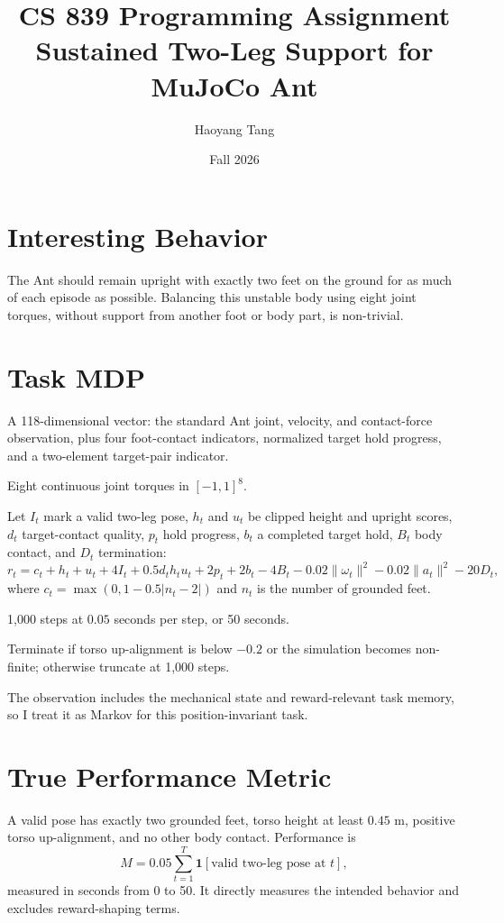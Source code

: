 \documentclass[11pt]{article}
\title{CS 839 Programming Assignment\\Sustained Two-Leg Support for MuJoCo Ant}
\author{Haoyang Tang}
\date{Fall 2026}
\begin{document}
\maketitle

\section{Interesting Behavior}
The Ant should remain upright with exactly two feet on the ground for as much
of each episode as possible. Balancing this unstable body using eight joint
torques, without support from another foot or body part, is non-trivial.

\section{Task MDP}
\begin{description}[style=nextline]
\item[State.] A 118-dimensional vector: the standard Ant joint, velocity, and
contact-force observation, plus four foot-contact indicators, normalized target
hold progress, and a two-element target-pair indicator.
\item[Action.] Eight continuous joint torques in $[-1,1]^8$.
\item[Reward.] Let $I_t$ mark a valid two-leg pose, $h_t$ and $u_t$ be clipped
height and upright scores, $d_t$ target-contact quality, $p_t$ hold progress,
$b_t$ a completed target hold, $B_t$ body contact, and $D_t$ termination:
\[
r_t=c_t+h_t+u_t+4I_t+0.5d_th_tu_t+2p_t+2b_t
-4B_t-0.02\lVert\omega_t\rVert^2-0.02\lVert a_t\rVert^2-20D_t,
\]
where $c_t=\max(0,1-0.5|n_t-2|)$ and $n_t$ is the number of grounded feet.
\item[Episode.] 1,000 steps at $0.05$ seconds per step, or 50 seconds.
\item[Termination.] Terminate if torso up-alignment is below $-0.2$ or the
simulation becomes non-finite; otherwise truncate at 1,000 steps.
\end{description}
The observation includes the mechanical state and reward-relevant task memory,
so I treat it as Markov for this position-invariant task.

\section{True Performance Metric}
A valid pose has exactly two grounded feet, torso height at least $0.45$ m,
positive torso up-alignment, and no other body contact. Performance is
\[
M=0.05\sum_{t=1}^{T}\mathbf{1}[\text{valid two-leg pose at }t],
\]
measured in seconds from 0 to 50. It directly measures the intended behavior
and excludes reward-shaping terms.
\end{document}
